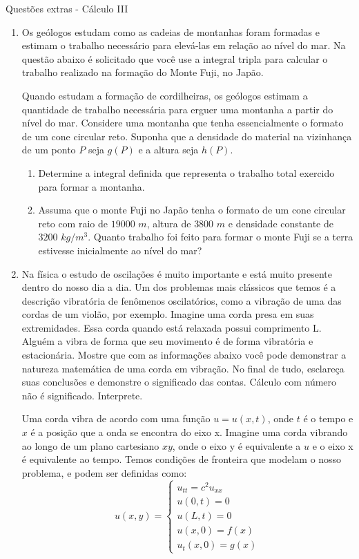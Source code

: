 \documentclass[11pt,a4paper]{article}
\begin{document}
	\begin{center}
		\Large Questões extras - Cálculo III
	\end{center}
	

	\begin{enumerate}
	
\item Os geólogos estudam como as cadeias de montanhas foram formadas e estimam o trabalho
necessário para elevá-las em relação ao nível do mar. Na questão abaixo é solicitado que você use a integral tripla para calcular o trabalho realizado na formação do Monte Fuji, no Japão.

Quando estudam a formação de cordilheiras, os geólogos estimam a quantidade de trabalho necessária para erguer uma montanha a partir do nível do mar. Considere uma montanha que tenha essencialmente o formato de um cone circular reto. Suponha que a densidade do material na vizinhança de um ponto $P$ seja $g(P)$ e a altura seja $h(P)$.

\begin{enumerate}
\item Determine a integral definida que representa o trabalho total exercido para formar a montanha.

\item Assuma que o monte Fuji no Japão tenha o formato de um cone circular reto com raio de $19000$ $m$, altura de $3800$ $m$ e densidade constante de $3200$ $kg/m^3$. Quanto trabalho foi feito para formar o monte Fuji se a terra estivesse inicialmente ao nível do mar? 
\end{enumerate}

\item Na física o estudo de oscilações é muito importante e está muito presente dentro do nosso dia a dia. Um dos problemas mais clássicos que temos é a descrição vibratória de fenômenos oscilatórios, como a vibração de uma das cordas de um violão, por exemplo. Imagine uma corda presa em suas extremidades. Essa corda quando está relaxada possui comprimento L. Alguém a vibra de forma que seu movimento é de forma vibratória e estacionária. Mostre que com as informações abaixo você pode demonstrar a natureza matemática de uma corda em vibração. No final de tudo, esclareça suas conclusões e demonstre o significado das contas. Cálculo com número não é significado. Interprete. 
	
	Uma corda vibra de acordo com uma função $u = u(x,t)$, onde $t$ é o tempo e $x$ é a posição que a onda se encontra do eixo x. Imagine uma corda vibrando ao longo de um plano cartesiano $xy$, onde o eixo y é equivalente a $u$ e o eixo x é equivalente ao tempo. Temos condições de fronteira que modelam o nosso problema, e podem ser definidas como:
	$$u(x,y) = 
		\begin{cases}
			u_{tt} = c^2u_{xx} \\
			u(0,t) = 0 \\
			u(L,t) = 0 \\
			u(x,0) = f(x) \\
			u_t(x,0) = g(x)
		\end{cases}
	$$
	

\end{enumerate}
\end{document}
